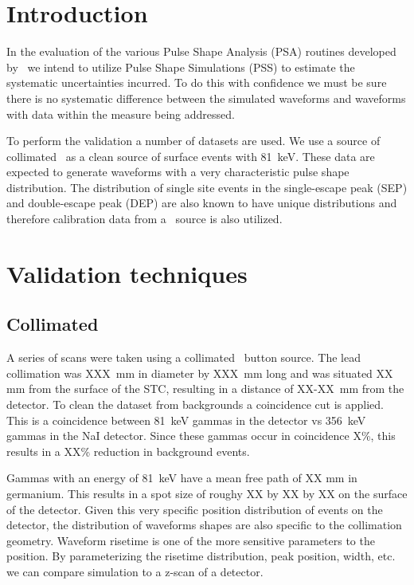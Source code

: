 \documentclass[groupedaddress,rmp,amsmath,amssymb,bibnotes,altaffilletter,twocolumn]{revtex4-1}
\begin{document}
\date{\today}
\maketitle
\thispagestyle{uniheader}
\tableofcontents

\section{Introduction}

In the evaluation of the various Pulse Shape Analysis (PSA) routines developed by \MJ~we intend to utilize Pulse Shape Simulations (PSS) to estimate the systematic uncertainties incurred. To do this with confidence we must be sure there is no systematic difference between the simulated waveforms and waveforms with data within the measure being addressed. 

To perform the validation a number of datasets are used. We use a source of collimated \baott~as a clean source of surface events with 81~keV. These data are expected to generate waveforms with a very characteristic pulse shape distribution. The distribution of single site events in the single-escape peak (SEP) and double-escape peak (DEP) are also known to have unique distributions and therefore calibration data from a \thtte~source is also utilized.

\section{Validation techniques}

\subsection{Collimated \baott}
A series of scans were taken using a collimated \baott~button source. The lead collimation was XXX~mm in diameter by XXX~mm long and was situated XX mm from the surface of the STC, resulting in a distance of XX-XX~mm from the detector. To clean the dataset from backgrounds a coincidence cut is applied. This is a coincidence between 81~keV gammas in the detector vs 356~keV gammas in the NaI detector. Since these gammas occur in coincidence X\%, this results in a XX\% reduction in background events.

Gammas with an energy of 81~keV have a mean free path of XX mm in germanium. This results in a spot size of roughy XX by XX by XX on the surface of the detector. Given this very specific position distribution of events on the detector, the distribution of waveforms shapes are also specific to the collimation geometry. Waveform risetime is one of the more sensitive parameters to the position. By parameterizing the risetime distribution, peak position, width, etc. we can compare simulation to a z-scan of a detector. 
\end{document}
